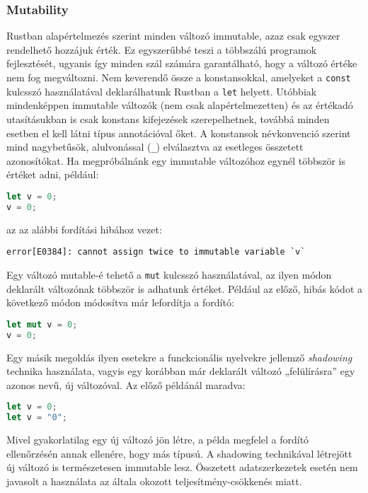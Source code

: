 \subsubsection{Mutability}
Rustban alapértelmezés szerint minden változó immutable, azaz csak egyszer rendelhető hozzájuk érték. Ez egyszerűbbé teszi a többszálú programok fejlesztését, ugyanis így minden szál számára garantálható, hogy a változó értéke nem fog megváltozni. Nem keverendő össze a konstansokkal, amelyeket a \texttt{const} kulcsszó használatával deklarálhatunk Rustban a \texttt{let} helyett. Utóbbiak mindenképpen immutable változók (nem csak alapértelmezetten) és az értékadó utasításukban is csak konstans kifejezések szerepelhetnek, továbbá minden esetben el kell látni típus annotációval őket. A konstansok névkonvenció szerint mind nagybetűsök, alulvonással (\lstinline{_}) elválasztva az esetleges összetett azonosítókat.
Ha megpróbálnánk egy immutable változóhoz egynél többször is értéket adni, például:
\begin{lstlisting}[language=Rust, style=boxed]
let v = 0;
v = 0;
\end{lstlisting}
az az alábbi fordítási hibához vezet:
\begin{verbatim}
error[E0384]: cannot assign twice to immutable variable `v`
\end{verbatim}
Egy változó mutable-é tehető a \texttt{mut} kulcsszó használatával, az ilyen módon deklarált változónak többször is adhatunk értéket. Például az előző, hibás kódot a következő módon módosítva már lefordítja a fordító:
\begin{lstlisting}[language=Rust, style=boxed]
let mut v = 0;
v = 0;
\end{lstlisting}
Egy másik megoldás ilyen esetekre a funckcionális nyelvekre %
jellemző \textit{shadowing} technika használata, vagyis egy korábban már deklarált változó „felülírásra” egy azonos nevű, új változóval. Az előző példánál maradva:
\begin{lstlisting}[language=Rust, style=boxed]
let v = 0;
let v = "0";
\end{lstlisting}
Mivel gyakorlatilag egy új változó jön létre, a példa megfelel a fordító ellenőrzésén annak ellenére, hogy más típusú. A shadowing technikával létrejött új változó is természetesen immutable lesz. Összetett adatszerkezetek esetén nem javasolt a használata az általa okozott teljesítmény-csökkenés miatt.

